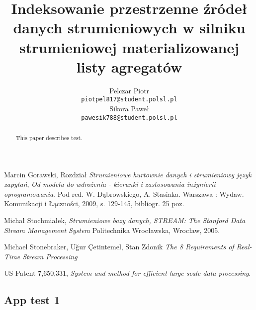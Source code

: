 \documentclass[12pt]{article}
\title{Indeksowanie przestrzenne źródeł danych strumieniowych w silniku strumieniowej materializowanej listy agregatów}
\author{
	  Pelczar Piotr\\
	  \small{\texttt{piotpel817@student.polsl.pl}}
	  \\[3ex]
	  Sikora Paweł\\
	  \small{\texttt{pawesik788@student.polsl.pl}}
	}
\date{\displaydate{date}}
\begin{document}
\maketitle
 
\begin{abstract}
This paper describes test.
\end{abstract}

\renewcommand{\contentsname}{Contents}

\newpage
\tableofcontents

\newpage











\newpage
\begin{thebibliography}{9}

  Marcin Gorawski,
  Rozdział \emph{Strumieniowe hurtownie danych i strumieniowy język zapytań},
  \emph{Od modelu do wdrożenia - kierunki i zastosowania inżynierii oprogramowania}.
  Pod red. W. Dąbrowskiego, A. Stasiaka.
  Warszawa : Wydaw. Komunikacji i Łączności,
  2009,
  s. 129-145,
  bibliogr. 25 poz.

  Michał Stochmiałek,
  \emph{Strumieniowe bazy danych, STREAM: The Stanford Data Stream Management System}
  Politechnika Wrocławska,
  Wrocław, 2005.

  Michael Stonebraker, Uğur Çetintemel, Stan Zdonik
  \emph{The 8 Requirements of Real-Time Stream Processing}

  US Patent 7,650,331,
  \emph{System and method for efficient large-scale data processing}.


\end{thebibliography}

\begin{appendices}
	\section{App test 1}
	\label{app:appTest1}

\end{appendices}
\end{document}
